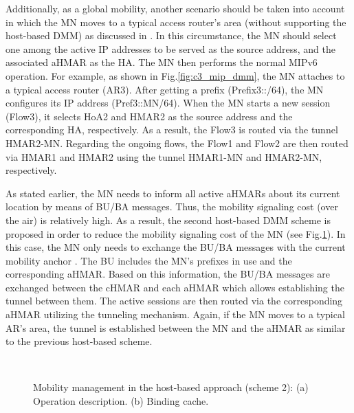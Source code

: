 Additionally, as a global mobility, another scenario should be taken into account in which the MN moves to a typical access router's area (without supporting the host-based DMM) as discussed in \cite{DMM_analysis_Hassan, MIP_based_DMM_Condeixa}. In this circumstance, the MN should select one among the active IP addresses to be served as the source address, and the associated aHMAR as the HA. The MN then performs the normal MIPv6 operation. For example, as shown in Fig.\ref{fig:c3_mip_dmm}, the MN attaches to a typical access router (AR3). After getting a prefix (Prefix3::/64), the MN configures its IP address (Pref3::MN/64). When the MN starts a new session (Flow3), it selects HoA2 and HMAR2 as the source address and the corresponding HA, respectively. As a result, the Flow3 is routed via the tunnel HMAR2-MN. Regarding the ongoing flows, the Flow1 and Flow2 are then routed via HMAR1 and HMAR2 using the tunnel HMAR1-MN and HMAR2-MN, respectively.

As stated earlier, the MN needs to inform all active aHMARs about its current location by means of BU/BA messages. Thus, the mobility signaling cost (over the air) is relatively high. As a result, the second host-based DMM scheme is proposed in order to reduce the mobility signaling cost of the MN (see Fig.\ref{fig:c3_mip_dmm_2}). In this case, the MN only needs to exchange the BU/BA messages with the current mobility anchor \cite{DMM_IETF_Lee}. The BU includes the MN's prefixes in use and the corresponding aHMAR. Based on this information, the BU/BA messages are exchanged between the cHMAR and each aHMAR which allows establishing the tunnel between them. The active sessions are then routed via the corresponding aHMAR utilizing the tunneling mechanism. Again, if the MN moves to a typical AR's area, the tunnel is established between the MN and the aHMAR as similar to the previous host-based scheme.  
\begin{figure}[h!]
\centering
{}\,\,\,\,\,\,
\caption[Mobility management in the host-based approach (scheme 2).]{Mobility management in the host-based approach (scheme 2): (a) Operation description. (b) Binding cache.}
\label{fig:c3_mip_dmm_2}
\end{figure}

